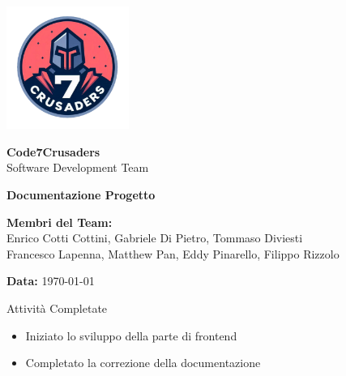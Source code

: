 \documentclass{beamer}
\begin{document}
\begin{frame}[plain] %
    \centering
    \vspace*{2cm}
    
    \includegraphics[width=0.3\textwidth]{../img/logo/7Crusaders_logo.png} %
    \vspace{1cm}
    
    {\Huge \textbf{Code7Crusaders}}\\
    \vspace{0.5cm}
    {\Large Software Development Team}\\
    \vspace{2cm}
    
    {\large \textbf{Documentazione Progetto}}\\
    \vspace{3cm}

    \textbf{Membri del Team:}\\
    Enrico Cotti Cottini, Gabriele Di Pietro, Tommaso Diviesti \\
    Francesco Lapenna, Matthew Pan, Eddy Pinarello, Filippo Rizzolo \\
    \vspace{1cm}
    
    {\large \textbf{Data:}} \today\\
    
    \vspace{1cm}
\end{frame}

\begin{frame}
    \begin{exampleblock}{Attività Completate}
        \begin{itemize}
            \item Iniziato lo sviluppo della parte di frontend
            \item Completato la correzione della documentazione
        \end{itemize}
    \end{exampleblock}
\end{frame}
\end{document}
